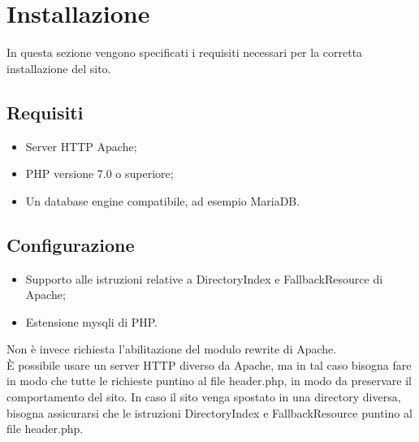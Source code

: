 \section{Installazione}
In questa sezione vengono specificati i requisiti necessari per la corretta installazione del sito.
\subsection{Requisiti}
\begin{itemize}
\item Server HTTP Apache;
\item PHP versione 7.0 o superiore;
\item Un database engine compatibile, ad esempio MariaDB.
\end{itemize}

\subsection{Configurazione}
\begin{itemize}
\item Supporto alle istruzioni relative a DirectoryIndex e FallbackResource di Apache;
\item Estensione mysqli di PHP.
\end{itemize}
Non è invece richiesta l'abilitazione del modulo rewrite di Apache.\\
È possibile usare un server HTTP diverso da Apache, ma in tal caso bisogna fare in modo che tutte le richieste puntino al file header.php, in modo da preservare il comportamento del sito.
In caso il sito venga spostato in una directory diversa, bisogna assicurarsi che le istruzioni DirectoryIndex e FallbackResource puntino al file header.php.